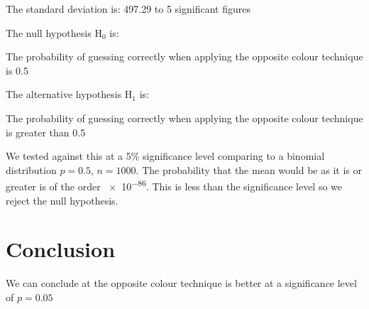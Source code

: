 \documentclass{article}
\begin{document}
    The standard deviation is: 497.29 to 5 significant figures
    
    The null hypothesis \(\mathrm{H}_0\) is: 
    
    \begin{displayquote}
        The probability of guessing correctly when applying the opposite colour technique is 0.5
    \end{displayquote}
    
    The alternative hypothesis \(\mathrm{H}_1\) is:
    
    \begin{displayquote}
        The probability of guessing correctly when applying the opposite colour technique is greater than 0.5
    \end{displayquote}
    
    We tested against this at a 5\% significance level comparing to a binomial distribution \(p=0.5\), \(n=1000\).
    The probability that the mean would be as it is or greater is of the order \num{e-86}.
    This is less than the significance level so we reject the null hypothesis.
    
    
    \section*{Conclusion}
    We can conclude at the opposite colour technique is better at a significance level of \(p=0.05\)
\end{document}
